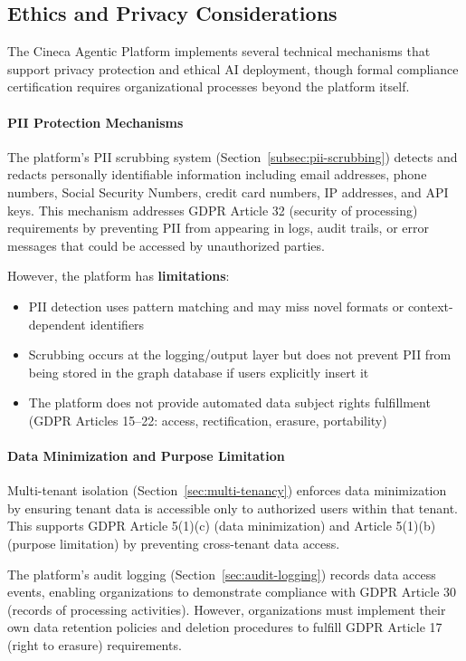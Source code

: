 \documentclass[a4paper,twoside]{sapthesis}
\begin{document}
\subsection{Ethics and Privacy Considerations}
\label{subsec:ethics-privacy}

The Cineca Agentic Platform implements several technical mechanisms that support privacy protection and ethical AI deployment, though formal compliance certification requires organizational processes beyond the platform itself.

\paragraph{PII Protection Mechanisms}

The platform's PII scrubbing system (Section~\ref{subsec:pii-scrubbing}) detects and redacts personally identifiable information including email addresses, phone numbers, Social Security Numbers, credit card numbers, IP addresses, and API keys. This mechanism addresses GDPR Article 32 (security of processing) requirements by preventing PII from appearing in logs, audit trails, or error messages that could be accessed by unauthorized parties.

However, the platform has \textbf{limitations}:
\begin{itemize}
    \item PII detection uses pattern matching and may miss novel formats or context-dependent identifiers
    \item Scrubbing occurs at the logging/output layer but does not prevent PII from being stored in the graph database if users explicitly insert it
    \item The platform does not provide automated data subject rights fulfillment (GDPR Articles 15--22: access, rectification, erasure, portability)
\end{itemize}

\paragraph{Data Minimization and Purpose Limitation}

Multi-tenant isolation (Section~\ref{sec:multi-tenancy}) enforces data minimization by ensuring tenant data is accessible only to authorized users within that tenant. This supports GDPR Article 5(1)(c) (data minimization) and Article 5(1)(b) (purpose limitation) by preventing cross-tenant data access.

The platform's audit logging (Section~\ref{sec:audit-logging}) records data access events, enabling organizations to demonstrate compliance with GDPR Article 30 (records of processing activities). However, organizations must implement their own data retention policies and deletion procedures to fulfill GDPR Article 17 (right to erasure) requirements.
\end{document}

